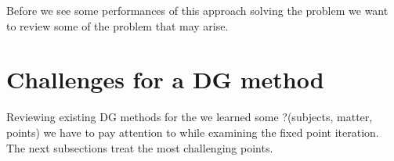 
Before we see some performances of this approach solving the \MA problem we want to review some of the problem that may arise.
\section{Challenges for a \MA DG method}
Reviewing existing DG methods for the \MA we learned some ?(subjects, matter, points) we have to pay attention to  while examining the fixed point iteration. The next subsections treat the most challenging points.


